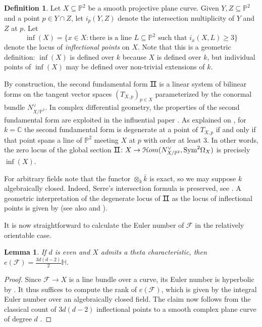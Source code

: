 \documentclass[12pt]{amsart}
\numberwithin{equation}{section}
\theoremstyle{plain}
\newtheorem{lem}[thm]{Lemma}
\theoremstyle{definition}
\newtheorem{defn}[thm]{Definition}
\newcommand{\mb}[1]{\mathbb{#1}}
\newcommand{\mc}[1]{\mathcal{#1}}
\newcommand{\Hom}{\mathcal{H}om}
\newcommand{\Sym}{\mathrm{Sym}}
\newcommand{\II}{\sbox0{II}\dimen0=\dimexpr\wd0+1pt\relax
  \makebox[\dimen0]{\rlap{\vrule width\dimen0 height 0.07ex depth 0.07ex}%
    \rlap{\vrule width\dimen0 height\dimexpr\ht0+0.07ex\relax 
            depth\dimexpr-\ht0+0.07ex\relax}%
    \kern.5pt \textnormal{II}\kern.5pt}}
\begin{document}
\begin{defn}
    Let $X\subseteq\mb{P}^2$ be a smooth projective plane curve. Given $Y,Z\subseteq\mb{P}^2$ and a point $p\in Y\cap Z$, let $i_p(Y,Z)$ denote the intersection multiplicity of $Y$ and $Z$ at $p$. Let
    \[\inf(X)=\{x\in X:\text{there is a line }L\subseteq\mb{P}^2\text{ such that }i_x(X,L)\geq 3\}\]
    denote the locus of \emph{inflectional points} on $X$. Note that this is a geometric definition: $\inf(X)$ is defined over $k$ because $X$ is defined over $k$, but individual points of $\inf(X)$ may be defined over non-trivial extensions of $k$.
\end{defn}

By construction, the second fundamental form $\II$ is a linear system of bilinear forms on the tangent vector spaces $(T_{X,p})_{p\in X}$ parameterized by the conormal bundle $N^\vee_{X/\mb{P}^2}$. In complex differential geometry, the properties of the second fundamental form are exploited in the influential paper \cite{MR1273267}. As explained on \cite[p.~367]{MR559347}, for $k=\mathbb{C}$ the second fundamental form is degenerate at a point of $T_{X,p}$ if and only if that point spans a line of $\mb{P}^2$ meeting $X$ at $p$ with order at least 3. In other words, the zero locus of the global section $\II\colon X\to\Hom(N^\vee_{X/\mb{P}^2},\Sym^2\Omega_X)$ is precisely $\inf(X)$.  

For arbitrary fields note that the functor $\otimes_k \bar k$ is exact, so we may suppose $k$ algebraically closed. Indeed, Serre's intersection formula is preserved, see \cite[Appendix A]{MR0463157}. A geometric interpretation of the degenerate locus of $\II$ as the locus of inflectional points is given by \cite[Section~3]{MP24} (see also \cite[Appendix~B,~Theorem 2.3]{MR1308020} and \cite{MR506323}).

It is now straightforward to calculate the Euler number of $\mc{F}$ in the relatively orientable case.

\begin{lem}
    If $d$ is even and $X$ admits a theta characteristic, then $e(\mc{F})=\frac{3d(d-2)}{2}\mb{H}$.
\end{lem}
\begin{proof}
    Since $\mc{F}\to X$ is a line bundle over a curve, its Euler number is hyperbolic by \cite[Proposition 19]{FourLines}. It thus suffices to compute the rank of $e(\mc{F})$, which is given by the integral Euler number over an algebraically closed field. The claim now follows from the classical count of $3d(d-2)$ inflectional points to a smooth complex plane curve of degree $d$ \cite[Exercise IV.2.3]{MR0463157}.
\end{proof}
\end{document}

